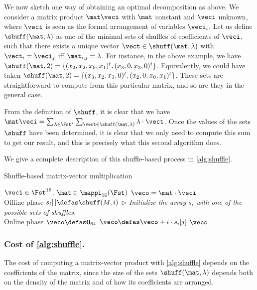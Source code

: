 \medskip

We now sketch one way of obtaining an optimal decomposition as above.
We consider a matrix product $\mat\veci$ with $\mat$ constant and $\veci$ unknown,
where $\veci$ is seen as the formal arrangement of variables $\veci_i$.
Let us define $\shuff(\mat, \lambda)$ as one of the minimal sets of shuffles of coefficients of $\veci$, such that
there exists a unique vector $\vect \in \shuff(\mat, \lambda)$ with $\vect_i = \veci_j$ iff $\mat_{i,j} = \lambda$.
For instance, in the above example, we have $\shuff(\mat,2) = \{(x_2,x_2,x_0,x_1)^t, (x_3,0,x_3,0)^t\}$. Equivalently, we could have taken
$\shuff(\mat, 2) = \{(x_3,x_2,x_3,0)^t, (x_2,0,x_0,x_1)^t\}$.
These sets are straightforward to compute from this particular matrix, and so are they in the general case.

From the definition of $\shuff$, it is clear that we have $\mat\veci = \sum_{\lambda \in \Fst^*}\sum_{\vect \in \shuff(\mat,\lambda)} \lambda\cdot \vect$.
Once the values of the sets $\shuff$ have been determined, it is clear that we only need to compute this sum to get our result, and 
this is precisely what this second algorithm does.

We give a complete description of this shuffle-based process in \autoref{alg:shuffle}.

\begin{algorithm}[!h]
  \caption{Shuffle-based matrix-vector multiplication}
\label{alg:shuffle}
\begin{algorithmic}[1]
  \REQUIRE $\veci \in \Fst^{16}$, $\mat \in \mappi_{16}(\Fst)$
  \ENSURE  $\veco = \mat\cdot\veci$\\
  Offline phase
  \STATE $s_i[\,] \defas \shuff(M, i)$ $\triangleright$ \emph{Initialize the array $s_i$ with one of the possible sets of shuffles.}
  \ENDFOR\\
  Online phase
  \STATE $\veco \defas \mathbf{0}_{64}$
  \STATE $\veco \defas \veco + i\cdot s_i[j]$
  \ENDFOR
  \ENDFOR
  \RETURN $\veco$
\end{algorithmic}
\end{algorithm}

\subsubsection{Cost of \autoref{alg:shuffle}.} The cost of computing a matrix-vector product with \autoref{alg:shuffle} depends
on the coefficients of the matrix, since the size of the sets $\shuff(\mat, \lambda)$ depends both on the density
of the matrix and of how its coefficients are arranged.

